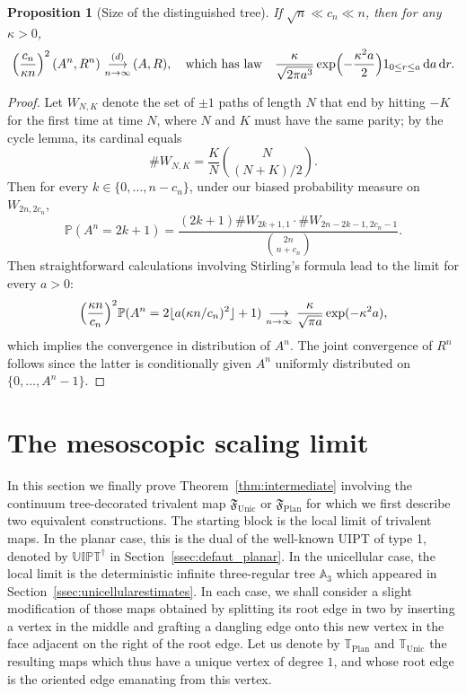 \documentclass[JEP,XML,SOM,Unicode,NoFloatCountersInSection,NoEqCountersInSection]{cedram}
\theoremstyle{plain}
\newtheorem{proposition}[theorem]{Proposition}
\theoremstyle{definition}
\theoremstyle{remark}
\renewcommand{\P}{\mathbb{P}}
\renewcommand{\d}{\mathop{}\!\mathrm{d}}
\newcommand{\cv}[1][n]{\,\mathop{\longrightarrow}^{}_{#1 \to \infty}\,}
\newcommand{\cvloi}[1][n]{\,\mathop{\longrightarrow}^{(d)}_{#1 \to \infty}\,}
\DeclarePairedDelimiter\floor{\lfloor}{\rfloor}
\begin{document}
\begin{proposition}[Size of the distinguished tree]\label{prop:volume_arbre_racine}
If $\sqrt{n} \ll c_n \ll n$, then for any $\kappa >0$,
\[
\left(\frac{c_n}{\kappa n}\right)^2 \left(A^n, R^n\right) \cvloi (A, R),
\quad\text{which has law}\quad
\frac{\kappa}{\sqrt{2 \pi a^3}} \exp\Bigl(- \frac{\kappa^2 a}{2}\Bigr) 1_{0 \le r \le a} \d a \d r.
\]
\end{proposition}

\begin{proof}
Let $W_{N,K}$ denote the set of $\pm1$ paths of length $N$ that end by hitting $-K$ for the first time at time $N$, where $N$ and $K$ must have the same parity; by the cycle lemma, its cardinal equals
\[
\#W_{N,K} = \frac{K}{N} \binom{N}{(N+K)/2}.
\]
Then for every $k \in \{0, \dots, n-c_{n}\}$, under our biased probability measure on $W_{2n, 2c_{n}}$,
\[
\P(A^n = 2k+1) = \frac{(2k+1) \#W_{2k+1,1} \cdot \#W_{2n-2k-1, 2c_{n}-1}}{\binom{2n}{n+c_{n}}}.
\]
Then straightforward calculations involving Stirling's formula lead to the limit for every $a>0$:
\[
\Bigl(\frac{\kappa n}{c_n}\Bigr)^2 \P(A^n = 2\floor{a (\kappa n/c_n)^2}+1)
\cv \frac{\kappa}{\sqrt{\pi a}} \exp(- \kappa^2 a),
\]
which implies the convergence in distribution of $A^n$.
The joint convergence of $R^n$ follows since the latter is conditionally given $A^n$ uniformly distributed on \hbox{$\{0, \dots, A^n\!-\!1\}$}.
\end{proof}

\section{The mesoscopic scaling limit}
\label{sec:mesoscopic}

In this section we finally prove Theorem~\ref{thm:intermediate} involving the continuum tree-decorated trivalent map $\mathfrak{F}_{ \mathrm{Unic}}$ or $\mathfrak{F}_{ \mathrm{Plan}}$ for which we first describe two equivalent constructions. The starting block is the local limit of trivalent maps.
In the planar case, this is the dual of the well-known UIPT of type 1, denoted by $\mathbb{UIPT}^\dagger$ in Section~\ref{ssec:defaut_planar}. In the unicellular case, the local limit is the deterministic infinite three-regular tree $\mathbb{A}_3$ which appeared in Section~\ref{ssec:unicellularestimates}.
In each case, we shall consider a slight modification of those maps obtained by splitting its root edge in two by inserting a vertex in the middle and grafting a dangling edge onto this new vertex in the face adjacent on the right of the root edge. Let us denote by $\mathbb{T}_ \mathrm{Plan}$ and $\mathbb{T}_{ \mathrm{Unic}}$ the resulting maps which thus have a unique vertex of degree $1$, and whose root edge is the oriented edge emanating from this vertex.
\end{document}
